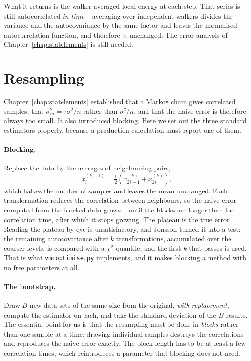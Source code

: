What it returns is the walker-averaged local energy at each step.  That series
is still autocorrelated \emph{in time} -- averaging over independent walkers
divides the variance and the autocovariance by the same factor and leaves the
normalised autocorrelation function, and therefore $\tau$, unchanged.  The
error analysis of Chapter~\ref{chap:statelements} is still needed.

\section{Resampling}
\label{sec:optresampling}

Chapter~\ref{chap:statelements} established that a Markov chain gives
correlated samples, that $\sigma_m^2=\tau\sigma^2/n$ rather than $\sigma^2/n$,
and that the naive error is therefore always too small.  It also introduced
blocking.  Here we set out the three standard estimators properly, because a
production calculation must report one of them.

\paragraph{Blocking.}
Replace the data by the averages of neighbouring pairs,
\begin{equation}
  x_i^{(k+1)} = \tfrac12\left(x_{2i-1}^{(k)} + x_{2i}^{(k)}\right),
  \label{eq:14-blocking}
\end{equation}
which halves the number of samples and leaves the mean unchanged.  Each
transformation reduces the correlation between neighbours, so the naive error
computed from the blocked data grows -- until the blocks are longer than the
correlation time, after which it stops growing.  The plateau is the true
error.  Reading the plateau by eye is unsatisfactory, and Jonsson turned it
into a test: the remaining autocovariance after $k$ transformations,
accumulated over the coarser levels, is compared with a $\chi^2$ quantile, and
the first $k$ that passes is used.  That is what \texttt{vmcoptimise.py}
implements, and it makes blocking a method with no free parameters at all.

\paragraph{The bootstrap.}
Draw $B$ new data sets of the same size from the original, \emph{with
replacement}, compute the estimator on each, and take the standard deviation
of the $B$ results.  The essential point for us is that the resampling must be
done in \emph{blocks} rather than one sample at a time: drawing individual
samples destroys the correlations and reproduces the naive error exactly.  The
block length has to be at least a few correlation times, which reintroduces a
parameter that blocking does not need.

